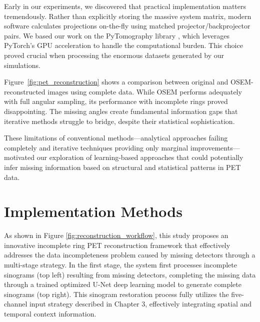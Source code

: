 \documentclass[
reprint,
superscriptaddress,
nofootinbib,
amsmath,amssymb,
aps,
prd,
]{revtex4-2}
\begin{document}
Early in our experiments, we discovered that practical implementation matters tremendously. Rather than explicitly storing the massive system matrix, modern software calculates projections on-the-fly using matched projector/backprojector pairs. We based our work on the PyTomography library \cite{POLSON2025102020}, which leverages PyTorch's GPU acceleration to handle the computational burden. This choice proved crucial when processing the enormous datasets generated by our simulations.

Figure~\ref{fig:pet_reconstruction} shows a comparison between original and OSEM-reconstructed images using complete data. While OSEM performs adequately with full angular sampling, its performance with incomplete rings proved disappointing. The missing angles create fundamental information gaps that iterative methods struggle to bridge, despite their statistical sophistication. 

These limitations of conventional methods—analytical approaches failing completely and iterative techniques providing only marginal improvements—motivated our exploration of learning-based approaches that could potentially infer missing information based on structural and statistical patterns in PET data.




\section{Implementation Methods}
\label{chap:methods}


As shown in Figure \ref{fig:reconstruction_workflow}, this study proposes an innovative incomplete ring PET reconstruction framework that effectively addresses the data incompleteness problem caused by missing detectors through a multi-stage strategy. In the first stage, the system first processes incomplete sinograms (top left) resulting from missing detectors, completing the missing data through a trained optimized U-Net deep learning model to generate complete sinograms (top right). This sinogram restoration process fully utilizes the five-channel input strategy described in Chapter 3, effectively integrating spatial and temporal context information.
\end{document}
